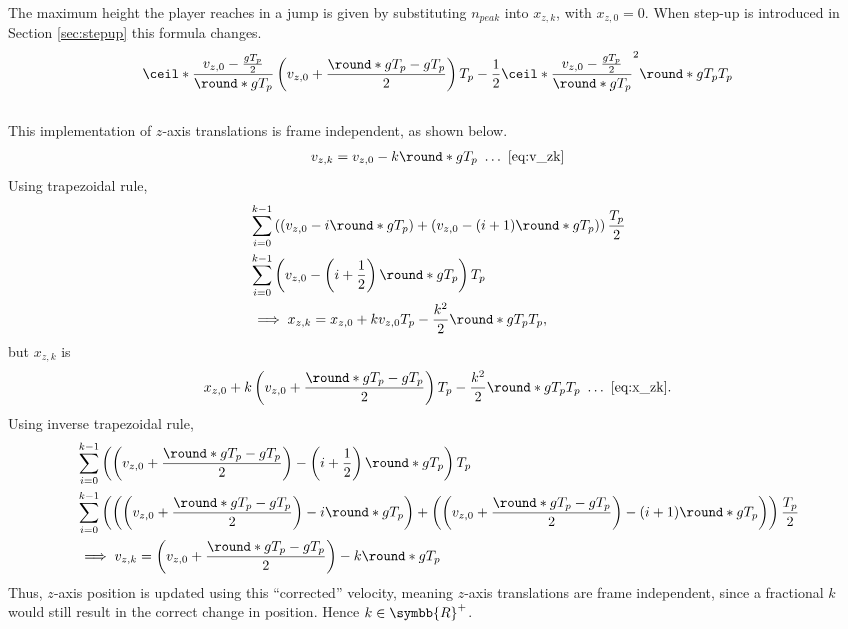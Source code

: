 The maximum height the player reaches in a jump is given by substituting $n_{peak}$ into $x_{z,k}$, with $x_{z,0} = 0$.
When step-up is introduced in Section \ref{sec:stepup} this formula changes.
\begin{align}
\label{eq:max_jump_height}
\ceil*{\frac{v_{z,0} - \frac{gT_p}{2}}{\round*{gT_p}}}\left(v_{z,0} + \frac{\round*{gT_p} - gT_p}{2} \right) T_p - \frac{1}{2}\ceil*{\frac{v_{z,0} - \frac{gT_p}{2}}{\round*{gT_p}}}^2 \round*{gT_p} T_p
\end{align}
\\
This implementation of $z$-axis translations is frame independent, as shown below.
\begin{align*}
v_{z,k} = v_{z,0} - k\round*{gT_p}\ \ldots\ \eqref{eq:v_zk}
\end{align*}
Using trapezoidal rule,
\begin{align*}
&\sum_{i=0}^{k-1} \left(\left(v_{z,0} - i\round*{gT_p} \right) + \left(v_{z,0} - (i + 1) \round*{gT_p} \right)\right) \frac{T_p}{2}\\
&\sum_{i=0}^{k-1} \left(v_{z,0} - \left(i + \frac{1}{2} \right) \round*{gT_p} \right) T_p\\
&\implies x_{z,k} = x_{z,0} + k v_{z,0} T_p - \frac{k^2}{2}\round*{gT_p} T_p,
\end{align*}
but $x_{z,k}$ is
\begin{align*}
x_{z,0} + k\left(v_{z,0} + \frac{\round*{gT_p} - gT_p}{2} \right) T_p - \frac{k^2}{2}\round*{gT_p} T_p\ \ldots\ \eqref{eq:x_zk}.
\end{align*}
Using inverse trapezoidal rule,
\begin{align}
\nonumber
&\sum_{i=0}^{k-1} \left(\left(v_{z,0} + \frac{\round*{gT_p} - gT_p}{2} \right) - \left(i + \frac{1}{2} \right) \round*{gT_p} \right) T_p\\\nonumber
&\sum_{i=0}^{k-1} \left(\left(\left(v_{z,0} + \frac{\round*{gT_p} - gT_p}{2} \right) - i\round*{gT_p} \right) + \left(\left(v_{z,0} + \frac{\round*{gT_p} - gT_p}{2} \right) - (i + 1)\round*{gT_p} \right) \right) \frac{T_p}{2}\\
\label{eq:corrected_v_zk}
&\implies v_{z,k} = \left(v_{z,0} + \frac{\round*{gT_p} - gT_p}{2} \right) - k\round*{gT_p}
\end{align}
Thus, $z$-axis position is updated using this ``corrected'' velocity, meaning $z$-axis translations are frame independent, since a fractional $k$ would still result in the correct change in position. Hence $k \in \symbb{R}^+$.\\

